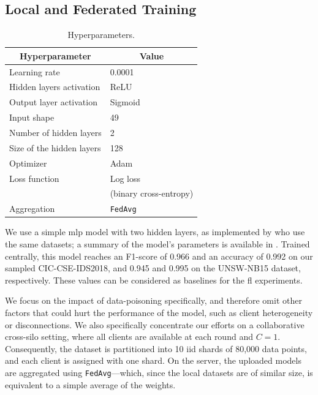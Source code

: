 \subsection{Local and Federated Training\label{sec:assess.method.models}}

\newcommand{\cellcenter}[1]{\multicolumn{1}{c}{#1}}
\begin{table}
  \centering
  \caption{Hyperparameters.\label{tbl:hyperparams}}
  \small
  \begin{tabular}{ll}
    \toprule %
    \cellcenter{\textbf{Hyperparameter}}   & \cellcenter{\textbf{Value}} \\
    \midrule %
    Learning rate             & 0.0001 \\
    Hidden layers activation  & ReLU \\
    Output layer activation   & Sigmoid \\
    Input shape               & 49 \\
    Number of hidden layers   & 2 \\ 
    Size of the hidden layers & 128 \\
    Optimizer                 & Adam \\
    Loss function             & Log loss \\
                              & (binary cross-entropy) \\
    Aggregation               & \texttt{FedAvg} \\
    \bottomrule %
  \end{tabular}
\end{table}

We use a simple \gls{mlp} model with two hidden layers, as implemented by \textcite{popoola_FederatedDeepLearning_2021} who use the same datasets; a summary of the model's parameters is available in .
Trained centrally, this model reaches an F1-score of 0.966 and an accuracy of 0.992 on our sampled CIC-CSE-IDS2018, and 0.945 and 0.995 on the UNSW-NB15 dataset, respectively.
These values can be considered as baselines for the \gls{fl} experiments.

We focus on the impact of data-poisoning specifically, and therefore omit other factors that could hurt the performance of the model, such as client heterogeneity or disconnections.
We also specifically concentrate our efforts on a collaborative cross-silo setting, where all clients are available at each round and $C=1$.
Consequently, the dataset is partitioned into 10 \gls{iid} shards of 80,000 data points, and each client is assigned with one shard.
On the server, the uploaded models are aggregated using \texttt{FedAvg}---which, since the local datasets are of similar size, is equivalent to a simple average of the weights.


